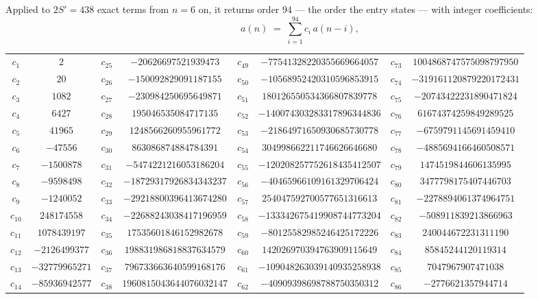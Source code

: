 \documentclass[11pt,a4paper]{article}
\theoremstyle{plain}
\theoremstyle{definition}
\begin{document}
Applied to $2S'=438$ exact terms from $n=6$ on, it returns order $94$ --- the
order the entry states --- with integer coefficients:
\[
a(n)\;=\;\sum_{i=1}^{94}c_i\,a(n-i),
\]
\begin{center}\small
\begin{tabular}{cccccccc}
$c_{1}$ & $2$ & $c_{25}$ & $-20626697521939473$ & $c_{49}$ & $-77541328220355669664057$ & $c_{73}$ & $1004868747575098797950$ \\
$c_{2}$ & $20$ & $c_{26}$ & $-150092829091187155$ & $c_{50}$ & $-10568952420310596853915$ & $c_{74}$ & $-319161120879220172431$ \\
$c_{3}$ & $1082$ & $c_{27}$ & $-230984250695649871$ & $c_{51}$ & $180126550534366807839778$ & $c_{75}$ & $-20743422231890471824$ \\
$c_{4}$ & $6427$ & $c_{28}$ & $195046535084717135$ & $c_{52}$ & $-140074303283317896344836$ & $c_{76}$ & $61674374259849289525$ \\
$c_{5}$ & $41965$ & $c_{29}$ & $1248566260955961772$ & $c_{53}$ & $-21864971650930685730778$ & $c_{77}$ & $-6759791145691459410$ \\
$c_{6}$ & $-47556$ & $c_{30}$ & $863086874884784391$ & $c_{54}$ & $304998662211746626646680$ & $c_{78}$ & $-4885694166460508571$ \\
$c_{7}$ & $-1500878$ & $c_{31}$ & $-5474221216053186204$ & $c_{55}$ & $-120208257752618435412507$ & $c_{79}$ & $1474519844606135995$ \\
$c_{8}$ & $-9598498$ & $c_{32}$ & $-18729317926834343237$ & $c_{56}$ & $-40465966109161329706424$ & $c_{80}$ & $3477798175407446703$ \\
$c_{9}$ & $-1240052$ & $c_{33}$ & $-29218800396413674280$ & $c_{57}$ & $254047592700577651316613$ & $c_{81}$ & $-2278894061374964751$ \\
$c_{10}$ & $248174558$ & $c_{34}$ & $-22688243038417196959$ & $c_{58}$ & $-133342675419908744773204$ & $c_{82}$ & $-508911839213866963$ \\
$c_{11}$ & $1078439197$ & $c_{35}$ & $17535601846152982678$ & $c_{59}$ & $-80125582985246425172226$ & $c_{83}$ & $240044672231311190$ \\
$c_{12}$ & $-2126499377$ & $c_{36}$ & $198831986818837634579$ & $c_{60}$ & $142026970394763909115649$ & $c_{84}$ & $85845244120119314$ \\
$c_{13}$ & $-32779965271$ & $c_{37}$ & $796733663640599168176$ & $c_{61}$ & $-109048263039140935258938$ & $c_{85}$ & $7047967907471038$ \\
$c_{14}$ & $-85936942577$ & $c_{38}$ & $1960815043644076032147$ & $c_{62}$ & $-40909398698788750350312$ & $c_{86}$ & $-2776621357944714$ \\

\end{tabular}
\end{center}
\end{document}

